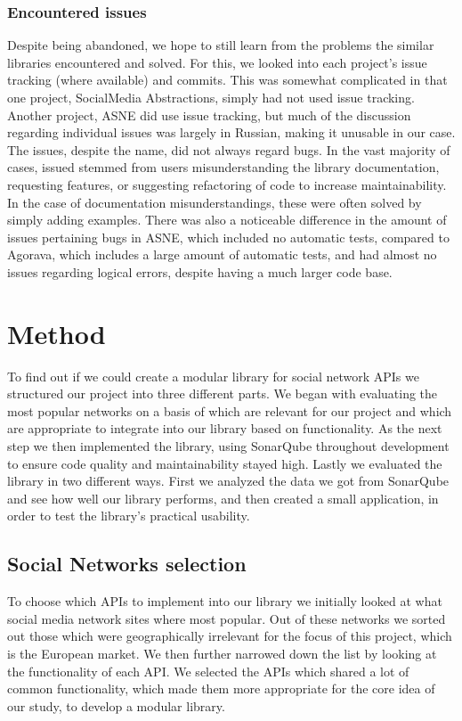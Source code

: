 \documentclass{sigchi-alternate}
\begin{document}
\subsubsection{Encountered issues}
Despite being abandoned, we hope to still learn from the problems the similar libraries encountered and solved. For this, we looked into each project's issue
tracking (where available) and commits. This was somewhat complicated in that one project, SocialMedia Abstractions, simply had not used issue tracking. 
Another project, ASNE did use issue tracking, but much of the discussion regarding individual issues was largely in Russian, making it unusable in our case. 
The issues, despite the name, did not always regard bugs. In the vast majority of cases, issued stemmed from users misunderstanding the library documentation,
requesting features, or suggesting refactoring of code to increase maintainability. In the case of documentation misunderstandings, these were often
solved by simply adding examples. There was also a noticeable difference in the amount of issues pertaining bugs in ASNE, which included no automatic tests,
compared to Agorava, which includes a large amount of automatic tests, and had almost no issues regarding logical errors, despite having a much larger code base.

\section{Method}
To find out if we could create a modular library for social network APIs we structured our project into three different parts. We began with evaluating the most 
popular networks on a basis of which are relevant for our project and which are appropriate to integrate into our library based on functionality. As the next step we then implemented
the library, using SonarQube throughout development to ensure code quality and maintainability stayed high. Lastly we evaluated the library in two different ways.
First we analyzed the data we got from SonarQube and see how well our library performs, and then created a small application, in order to test the library's practical usability.

\subsection{Social Networks selection}
To choose which APIs to implement into our library we initially looked at what social media network sites where most popular\autocite{STATISTA_LEADING_SOCIAL_NETWORKS}.
Out of these networks we sorted out those which were geographically irrelevant for the focus of this project, which is the European market. We then further narrowed down
the list by looking at the functionality of each API. We selected the APIs which shared a lot of common functionality, which made them more appropriate for the core idea
of our study, to develop a modular library.
\end{document}
